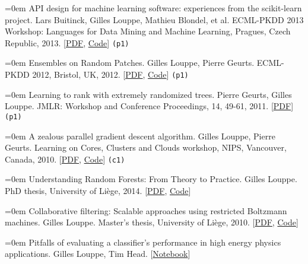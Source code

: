 \documentclass{scrartcl}
\newcommand{\MarginText}[1]{\marginpar{\raggedleft\itshape\small#1}}
\newcommand{\NewPublication}[4]{\noindent\hangindent=0em\hangafter=0 \MarginText{\color{black} #1}{\footnotesize [{\color{Maroon}#2}]} #3 {\footnotesize\color{gray}#4}\vspace{0.5em}}
\begin{document}
\begin{cv}{}
\NewPublication{}{4}{API design for machine learning software: experiences from the scikit-learn project.}{%
Lars Buitinck, Gilles Louppe, Mathieu Blondel, et al.
ECML-PKDD 2013 Workshop: Languages for Data Mining and Machine Learning, Pragues, Czech Republic, 2013.
[\href{http://hdl.handle.net/2268/154357}{PDF}, \href{http://github.com/scikit-learn/scikit-learn}{Code}]
{\color{black}\tt (p1)}}

\NewPublication{}{3}{Ensembles on Random Patches.}{%
Gilles Louppe, Pierre Geurts.
ECML-PKDD 2012, Bristol, UK, 2012.
[\href{http://hdl.handle.net/2268/130099}{PDF}, \href{http://github.com/scikit-learn/scikit-learn/blob/master/sklearn/ensemble/bagging.py}{Code}]
{\color{black}\tt (p1)}}

\NewPublication{}{2}{Learning to rank with extremely randomized trees.}{%
Pierre Geurts, Gilles Louppe.
JMLR: Workshop and Conference Proceedings, 14, 49-61, 2011.
[\href{http://hdl.handle.net/2268/84538}{PDF}]
{\color{black}\tt (p1)}}

\NewPublication{}{1}{A zealous parallel gradient descent algorithm.}{%
Gilles Louppe, Pierre Geurts.
Learning on Cores, Clusters and Clouds workshop, NIPS, Vancouver, Canada, 2010.
[\href{http://hdl.handle.net/2268/80780}{PDF}, \href{http://hdl.handle.net/2268/80780}{Code}]
{\color{black}\tt (c1)}}



\NewPublication{thesis}{2}{Understanding Random Forests: From Theory to Practice.}{%
Gilles Louppe.
PhD thesis, University of Li{\`e}ge, 2014.
[\href{http://hdl.handle.net/2268/170309}{PDF}, \href{https://github.com/glouppe/phd-thesis}{Code}]}

\NewPublication{}{1}{Collaborative filtering: Scalable approaches using restricted Boltzmann machines.}{%
Gilles Louppe.
Master's thesis, University of Li{\`e}ge, 2010.
[\href{http://hdl.handle.net/2268/74400}{PDF}, \href{http://hdl.handle.net/2268/74400}{Code}]}



\NewPublication{others}{1}{Pitfalls of evaluating a classifier’s performance in high energy physics applications.}{%
Gilles Louppe, Tim Head.
[\href{http://dx.doi.org/10.5281/zenodo.34934}{Notebook}]}




\vspace{2em}




\end{cv}
\end{document}
